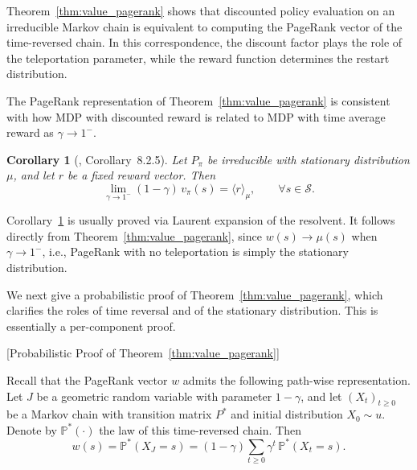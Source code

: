 \documentclass[letterpaper, 10 pt, conference]{ieeeconf}
\newtheorem{corollary}{Corollary}
\begin{document}

Theorem~\ref{thm:value_pagerank} shows that discounted policy evaluation on an
irreducible Markov chain is equivalent to computing the PageRank vector of the
time-reversed chain.
In this correspondence, the discount factor plays the role of the teleportation
parameter, while the reward function determines the restart distribution.

The PageRank representation of Theorem~\ref{thm:value_pagerank} is consistent
with how MDP with discounted reward is related to MDP with time average reward as $\gamma \to 1^-$.

\begin{corollary}[\cite{puterman2014markov}, Corollary~8.2.5]
\label{lem:undiscounted_limit}
Let $P_\pi$ be irreducible with stationary distribution $\mu$, and let $r$ be a
fixed reward vector. Then
$$
\lim_{\gamma \to 1^-} (1-\gamma)\, v_\pi(s)
=
\langle r \rangle_\mu ,
\qquad \forall s \in \mathcal S .
$$
\end{corollary}

Corollary~\ref{lem:undiscounted_limit} is usually proved via Laurent expansion of the resolvent. It follows directly from Theorem~\ref{thm:value_pagerank}, since $w(s) \to \mu(s)$ when $\gamma \to 1^-$, i.e., PageRank with no teleportation is simply the stationary distribution.

\medskip

We next give a probabilistic proof of Theorem~\ref{thm:value_pagerank}, which clarifies
the roles of time reversal and of the stationary distribution. This is essentially a per-component proof.

[Probabilistic Proof of Theorem~\ref{thm:value_pagerank}]

Recall that the PageRank vector $w$ admits
the following path-wise representation. Let $J$ be a geometric random variable
with parameter $1-\gamma$, and let
$(X_t)_{t\ge0}$ be a Markov chain with transition matrix $P^*$ and initial
distribution $X_0\sim u$. Denote by $\mathbb{P}^*(\cdot)$ the law of this time-reversed chain. Then
$$
w(s) = \mathbb{P}^*(X_J=s)
= (1-\gamma)\sum_{t\ge0}\gamma^t\,\mathbb{P}^*(X_t=s).
$$
\end{document}
